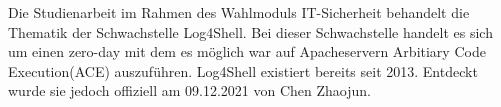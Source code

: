 
\textbf{}
\begin{flushleft}
Die Studienarbeit im Rahmen des Wahlmoduls IT-Sicherheit behandelt die Thematik
der Schwachstelle Log4Shell. Bei dieser Schwachstelle handelt es sich um einen
zero-day mit dem es möglich war auf Apacheservern Arbitiary
Code Execution(ACE) auszuführen. Log4Shell existiert bereits seit 2013. Entdeckt
wurde sie jedoch offiziell am 09.12.2021 von Chen Zhaojun.
\end{flushleft}


